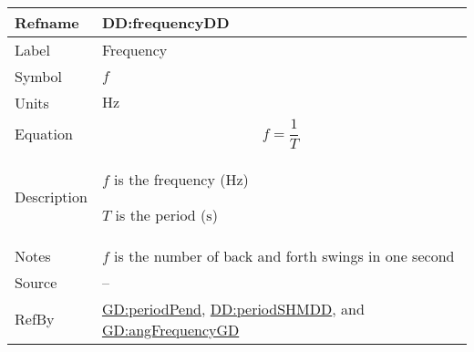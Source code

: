 \documentclass[12pt]{article}
\begin{document}
\vspace{\baselineskip}
\noindent
\begin{minipage}{\textwidth}
\begin{tabular}{>{\raggedright}p{}>{\raggedright\arraybackslash}p{}}
\toprule \textbf{Refname} & \textbf{DD:frequencyDD}
\label{DD:frequencyDD}
\\ \midrule
Label & Frequency
        
\\ \midrule
Symbol & $f$
         
\\ \midrule
Units & ${\text{Hz}}$
        
\\ \midrule
Equation & \begin{displaymath}
           f=\frac{1}{T}
           \end{displaymath}
\\ \midrule
Description & \begin{symbDescription}
              \item{$f$ is the frequency (${\text{Hz}}$)}
              \item{$T$ is the period (${\text{s}}$)}
              \end{symbDescription}
\\ \midrule
Notes & $f$ is the number of back and forth swings in one second
        
\\ \midrule
Source & --
         
\\ \midrule
RefBy & \hyperref[GD:periodPend]{GD:periodPend}, \hyperref[DD:periodSHMDD]{DD:periodSHMDD}, and \hyperref[GD:angFrequencyGD]{GD:angFrequencyGD}
        
\\ \bottomrule
\end{tabular}
\end{minipage}
\end{document}
